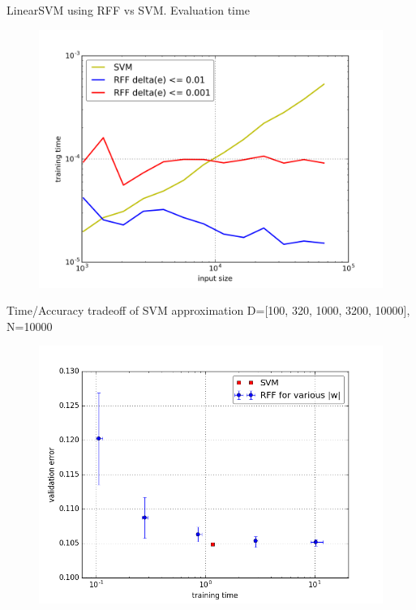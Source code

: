 \documentclass[unknownkeysallowed]{beamer}
\begin{document}
\begin{frame}{LinearSVM using RFF vs SVM. Evaluation time}
\begin{figure}
\includegraphics[scale=0.45]{img/svm_tm_n10_N131072_k10--eval_}
\end{figure}
\end{frame}

\begin{frame}{Time/Accuracy tradeoff of SVM approximation}
 D=[100, 320, 1000, 3200, 10000], N=10000
\begin{figure}
\includegraphics[scale=0.40]{img/svm_timeerror_10-90_n6N10000k50k5}
\end{figure}

\end{frame}
\end{document}
